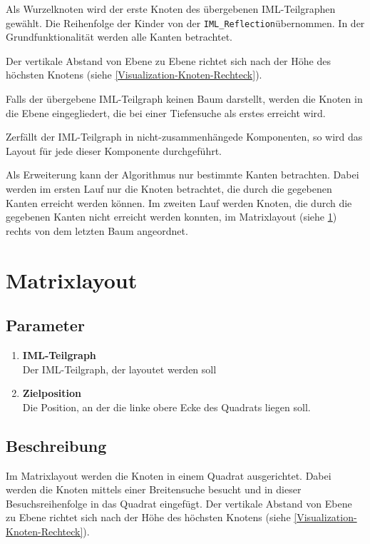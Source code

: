 Als Wurzelknoten wird der erste Knoten des \"ubergebenen IML-Teilgraphen gew\"ahlt. Die Reihenfolge der Kinder von der \texttt{IML\_Reflection}\xspace\"ubernommen. In der Grundfunktionalit\"at werden alle Kanten betrachtet.

Der vertikale Abstand von Ebene zu Ebene richtet sich nach der H\"ohe des h\"ochsten Knotens (siehe \ref{Visualization-Knoten-Rechteck}).

Falls der \"ubergebene IML-Teilgraph keinen Baum darstellt, werden die Knoten in die Ebene eingegliedert, die bei einer Tiefensuche als erstes erreicht wird.

Zerf\"allt der IML-Teilgraph in nicht-zusammenh\"angede Komponenten, so wird das Layout f\"ur jede dieser Komponente durchgef\"uhrt.

Als Erweiterung kann der Algorithmus nur bestimmte Kanten betrachten. Dabei werden im ersten Lauf nur die Knoten betrachtet, die durch die gegebenen Kanten erreicht werden k\"onnen.
Im zweiten Lauf werden Knoten, die durch die gegebenen Kanten nicht erreicht werden konnten, im Matrixlayout (siehe \ref{Matrixlayout}) rechts von dem letzten Baum angeordnet.

\section{Matrixlayout}
\label{Matrixlayout}
\subsection{Parameter}
\begin{enumerate}
  \item \textbf{IML-Teilgraph}\\
Der IML-Teilgraph, der layoutet werden soll
  \item \textbf{Zielposition}\\
Die Position, an der die linke obere Ecke des Quadrats liegen soll.
\end{enumerate}

\subsection{Beschreibung}
Im Matrixlayout werden die Knoten in einem Quadrat ausgerichtet.
Dabei werden die Knoten mittels einer Breitensuche besucht und in dieser Besuchsreihenfolge in das Quadrat eingef\"ugt. 
Der vertikale Abstand von Ebene zu Ebene richtet sich nach der H\"ohe des h\"ochsten Knotens (siehe \ref{Visualization-Knoten-Rechteck}).


